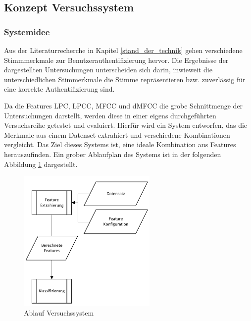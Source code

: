 \subsection{Konzept Versuchssystem}

\subsubsection{Systemidee}

Aus der Literaturrecherche in Kapitel \ref{stand_der_technik} gehen verschiedene Stimmmerkmale zur Benutzerauthentifizierung hervor.
Die Ergebnisse der dargestellten Untersuchungen unterscheiden sich darin, inwieweit die unterschiedlichen Stimmerkmale die Stimme repräsentieren bzw. zuverlässig für eine korrekte Authentifizierung sind.

Da die Features \ac{LPC}, \ac{LPCC}, \ac{MFCC} und \ac{dMFCC} die grobe Schnittmenge der Untersuchungen darstellt, werden diese in einer eigens durchgeführten Versuchsreihe getestet und evaluiert.
Hierfür wird ein System entworfen, das die Merkmale aus einem Datenset extrahiert und verschiedene Kombinationen vergleicht.
Das Ziel dieses Systems ist, eine ideale Kombination aus Features herauszufinden.
Ein grober Ablaufplan des Systems ist in der folgenden Abbildung \ref{fig:PAP_DemoSystem} dargestellt.
\begin{figure}[H]
    \centering
    \includegraphics[width=0.6\textwidth, keepaspectratio]{images/PAP_Demosystem.pdf}
    \caption{Ablauf Versuchssystem}
    \label{fig:PAP_DemoSystem}
\end{figure}


